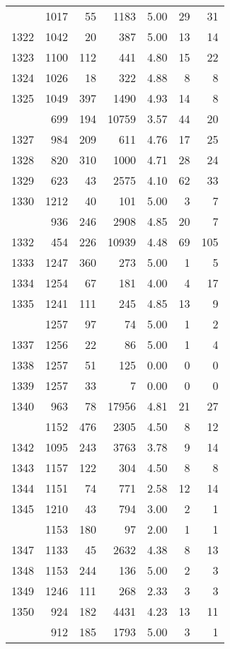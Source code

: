 \documentclass[
]{article}
\begin{document}
\begin{table}
\begin{tabular}[t]{lrrrrrr}
\addlinespace
1321 & 1017 & 55 & 1183 & 5.00 & 29 & 31\\
1322 & 1042 & 20 & 387 & 5.00 & 13 & 14\\
1323 & 1100 & 112 & 441 & 4.80 & 15 & 22\\
1324 & 1026 & 18 & 322 & 4.88 & 8 & 8\\
1325 & 1049 & 397 & 1490 & 4.93 & 14 & 8\\
\addlinespace
1326 & 699 & 194 & 10759 & 3.57 & 44 & 20\\
1327 & 984 & 209 & 611 & 4.76 & 17 & 25\\
1328 & 820 & 310 & 1000 & 4.71 & 28 & 24\\
1329 & 623 & 43 & 2575 & 4.10 & 62 & 33\\
1330 & 1212 & 40 & 101 & 5.00 & 3 & 7\\
\addlinespace
1331 & 936 & 246 & 2908 & 4.85 & 20 & 7\\
1332 & 454 & 226 & 10939 & 4.48 & 69 & 105\\
1333 & 1247 & 360 & 273 & 5.00 & 1 & 5\\
1334 & 1254 & 67 & 181 & 4.00 & 4 & 17\\
1335 & 1241 & 111 & 245 & 4.85 & 13 & 9\\
\addlinespace
1336 & 1257 & 97 & 74 & 5.00 & 1 & 2\\
1337 & 1256 & 22 & 86 & 5.00 & 1 & 4\\
1338 & 1257 & 51 & 125 & 0.00 & 0 & 0\\
1339 & 1257 & 33 & 7 & 0.00 & 0 & 0\\
1340 & 963 & 78 & 17956 & 4.81 & 21 & 27\\
\addlinespace
1341 & 1152 & 476 & 2305 & 4.50 & 8 & 12\\
1342 & 1095 & 243 & 3763 & 3.78 & 9 & 14\\
1343 & 1157 & 122 & 304 & 4.50 & 8 & 8\\
1344 & 1151 & 74 & 771 & 2.58 & 12 & 14\\
1345 & 1210 & 43 & 794 & 3.00 & 2 & 1\\
\addlinespace
1346 & 1153 & 180 & 97 & 2.00 & 1 & 1\\
1347 & 1133 & 45 & 2632 & 4.38 & 8 & 13\\
1348 & 1153 & 244 & 136 & 5.00 & 2 & 3\\
1349 & 1246 & 111 & 268 & 2.33 & 3 & 3\\
1350 & 924 & 182 & 4431 & 4.23 & 13 & 11\\
\addlinespace
1351 & 912 & 185 & 1793 & 5.00 & 3 & 1\\

\end{tabular}
\end{table}
\end{document}
